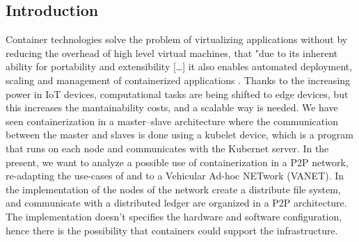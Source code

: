 \documentclass[acmsmall, screen,timestamp,nonacm]{acmart}
\begin{document}
\subsection{Introduction} %
\label{sub:containers}
Container technologies solve the problem of
virtualizing applications without by reducing the overhead of high level virtual 
machines, that "due to its inherent
ability for portability and extensibility [\ldots] it also enables
automated deployment, scaling and management of containerized applications \cite{8825476}.
Thanks to the increasing power in IoT devices, computational tasks are being shifted
to edge devices, but this increases the mantainability costs, and a scalable way
is needed. 
We have seen containerization in a master–slave architecture
where the communication between the master and slaves is
done using a kubelet device, which is a program that runs on each node and
communicates with the Kubernet server.
In the present, we want to analyze a possible use of containerization in a P2P
network, re-adapting the use-cases of \cite{8825476} and \cite{Mo2017} to a
Vehicular Ad-hoc NETwork (VANET). In the implementation of \cite{9102237} the
nodes of the network create a distribute file system, and communicate with a
distributed ledger are organized in a P2P architecture. The implementation
doesn't specifies the hardware and software configuration, hence there is the
possibility that containers could support the infrastructure. 
\end{document}
